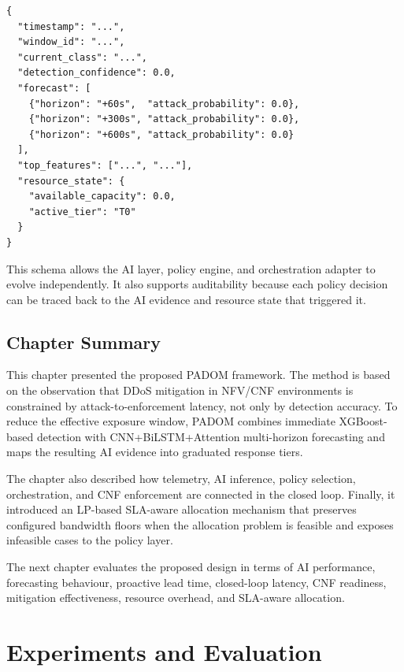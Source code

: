 \documentclass[12pt, a4paper, reqno, oneside]{book}
\newcommand{\padonap}{\textsc{PADOM}}
\begin{document}
\begin{verbatim}
{
  "timestamp": "...",
  "window_id": "...",
  "current_class": "...",
  "detection_confidence": 0.0,
  "forecast": [
    {"horizon": "+60s",  "attack_probability": 0.0},
    {"horizon": "+300s", "attack_probability": 0.0},
    {"horizon": "+600s", "attack_probability": 0.0}
  ],
  "top_features": ["...", "..."],
  "resource_state": {
    "available_capacity": 0.0,
    "active_tier": "T0"
  }
}
\end{verbatim}

This schema allows the AI layer, policy engine, and orchestration adapter to
evolve independently. It also supports auditability because each policy
decision can be traced back to the AI evidence and resource state that
triggered it.

\section{Chapter Summary}
\label{sec:proposed-summary}

This chapter presented the proposed \padonap{} framework. The method is based
on the observation that DDoS mitigation in NFV/CNF environments is constrained
by attack-to-enforcement latency, not only by detection accuracy. To reduce the
effective exposure window, \padonap{} combines immediate XGBoost-based
detection with CNN+BiLSTM+Attention multi-horizon forecasting and maps the
resulting AI evidence into graduated response tiers.

The chapter also described how telemetry, AI inference, policy selection,
orchestration, and CNF enforcement are connected in the closed loop. Finally,
it introduced an LP-based SLA-aware allocation mechanism that preserves
configured bandwidth floors when the allocation problem is feasible and exposes
infeasible cases to the policy layer.

The next chapter evaluates the proposed design in terms of AI performance,
forecasting behaviour, proactive lead time, closed-loop latency, CNF readiness,
mitigation effectiveness, resource overhead, and SLA-aware allocation.
\chapter{Experiments and Evaluation}
\label{ch:eval}
\end{document}
